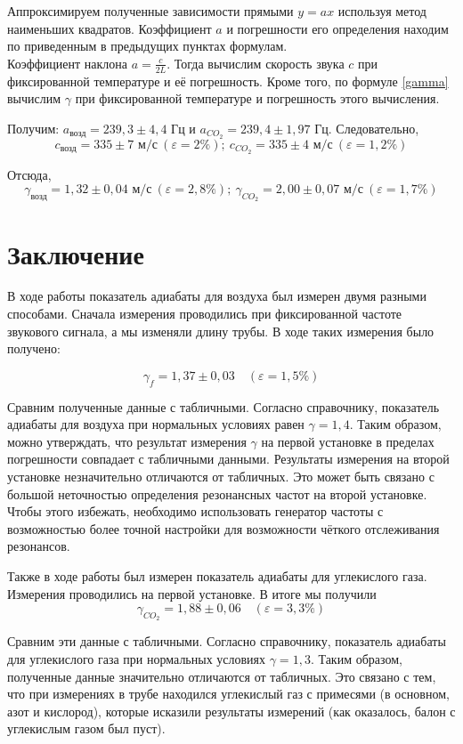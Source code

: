 \documentclass[a4paper, 12pt]{article}
\begin{document}
            \noindent Аппроксимируем полученные зависимости прямыми $y=ax$ используя метод наименьших квадратов. Коэффициент $a$ и погрешности его определения находим по приведенным в предыдущих пунктах формулам.\\

            \noindent Коэффициент наклона $\displaystyle a = \frac{c}{2L}$. Тогда вычислим скорость звука $c$ при фиксированной температуре и её погрешность. Кроме того, по формуле \eqref{gamma} вычислим $\gamma$ при фиксированной температуре и погрешность этого вычисления. 

            \noindent Получим: $a_{\text{возд}} = 239,3 \pm 4,4$ Гц и $a_{CO_2} = 239,4 \pm 1,97$ Гц. Следовательно,
            $$
            \boxed{c_{\text{возд}} = 335 \pm 7 \text{ м/с} \: (\varepsilon = 2 \%); \: c_{CO_2} = 335 \pm 4 \text{ м/с} \: (\varepsilon = 1,2 \%)}
            $$

            \noindent Отсюда,
            $$
            \boxed{\gamma_{\text{возд}} = 1,32 \pm 0,04 \text{ м/с} \: (\varepsilon = 2,8 \%); \: \gamma_{CO_2} = 2,00 \pm 0,07 \text{ м/с} \: (\varepsilon = 1,7 \%)}
            $$


    \section*{Заключение}
        \noindent В ходе работы показатель адиабаты для воздуха был измерен двумя разными способами. Сначала измерения проводились при фиксированной частоте звукового сигнала, а мы изменяли длину трубы. В ходе таких измерения было получено:

        \[ \boxed{\gamma_f = 1,37 \pm 0,03}\quad (\varepsilon=1,5\%) \]

        \noindent Сравним полученные данные с табличными. Согласно справочнику, показатель адиабаты для воздуха при нормальных условиях равен \underline{$\gamma = 1,4$}. Таким образом, можно утверждать, что результат измерения $\gamma$ на первой установке в пределах погрешности совпадает с табличными данными. Результаты измерения на второй установке незначительно отличаются от табличных. Это может быть связано с большой неточностью определения резонансных частот на второй установке. Чтобы этого избежать, необходимо использовать генератор частоты с возможностью более точной настройки для возможности чёткого отслеживания резонансов.

        \noindent Также в ходе работы был измерен показатель адиабаты для углекислого газа. Измерения проводились на первой установке. В итоге мы получили \[ \boxed{\gamma_{CO_2} = 1,88\pm 0,06}\quad (\varepsilon=3,3\%) \]

        \noindent Сравним эти данные с табличными. Согласно справочнику, показатель адиабаты для углекислого газа при нормальных условиях \underline{$ \gamma = 1,3 $}. Таким образом, полученные данные значительно отличаются от табличных. Это связано с тем, что при измерениях в трубе находился углекислый газ с примесями (в основном, азот и кислород), которые исказили результаты измерений (как оказалось, балон с углекислым газом был пуст).
\end{document}
